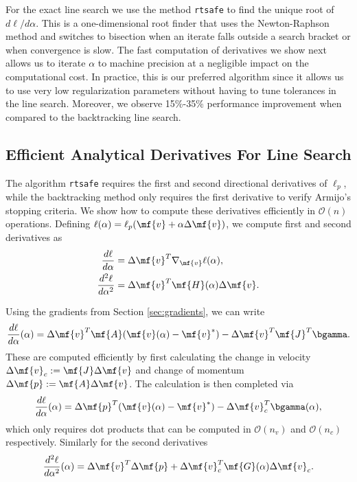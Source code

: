 For the exact line search we use the method \verb;rtsafe; \cite[\S
9.4]{bib:numerical_recipes} to find the unique root of $d\ell/d\alpha$. This is
a one-dimensional root finder that uses the Newton-Raphson method and switches
to bisection when an iterate falls outside a search bracket or when convergence
is slow. The fast computation of derivatives we show next allows us to iterate
$\alpha$ to machine precision at a negligible impact on the computational cost.
In practice, this is our preferred algorithm since it allows us to use very low
regularization parameters without having to tune tolerances in the line search.
Moreover, we observe 15\%-35\% performance improvement when compared to the
backtracking line search.

\subsection{Efficient Analytical Derivatives For Line Search}

The algorithm \verb;rtsafe; requires the first and second directional
derivatives of $\ell_p$, while the backtracking method only requires the first
derivative to verify Armijo's stopping criteria. We show how to compute these
derivatives efficiently in $\mathcal{O}(n)$ operations. Defining $\ell(\alpha) =
\ell_p(\mf{v}+\alpha\Delta\mf{v})$, we compute first and second derivatives as
\begin{align*}
	\frac{d\ell}{d\alpha}&=\Delta\mf{v}^T\nabla_\mf{v}\ell(\alpha),\\
	\frac{d^2\ell}{d\alpha^2}&=\Delta\mf{v}^T\mf{H}(\alpha)\Delta\mf{v}.
\end{align*}

Using the gradients from Section \ref{sec:gradients}, we can write
\begin{align*}
	\frac{d\ell}{d\alpha}(\alpha)=\Delta\mf{v}^T\mf{A}(\mf{v}(\alpha)-\mf{v}^*)-\Delta\mf{v}^T\mf{J}^T\bgamma.
\end{align*}
These are computed efficiently by first calculating the change in velocity
$\Delta\mf{v}_c:=\mf{J}\Delta\mf{v}$ and change of momentum $\Delta\mf{p} :=
\mf{A}\Delta\mf{v}$. The calculation is then completed via 
\begin{align*}
	\frac{d\ell}{d\alpha}(\alpha)=\Delta\mf{p}^T(\mf{v}(\alpha)-\mf{v}^*)
	-\Delta\mf{v}_c^T\bgamma(\alpha),
\end{align*}
which only requires dot products that can be computed in $\mathcal{O}(n_v)$ and
$\mathcal{O}(n_c)$ respectively. Similarly for the second derivatives
\begin{align*}
	\frac{d^2\ell}{d\alpha^2}(\alpha)=\Delta\mf{v}^T\Delta\mf{p} + \Delta\mf{v}_c^T
	\mf{G}(\alpha)\Delta\mf{v}_c.
\end{align*}

